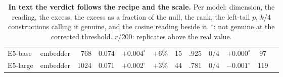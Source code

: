 \begin{table}[H]
\begin{tabular}{llrccccccc|cc}
E5-base & embedder & 768 & $0.074$ & $+0.004^{\circ}$ & $+6\%$ & 15 & .925 & 0/4 & $+0.000^{\circ}$ & 97 \\
E5-large & embedder & 1024 & $0.071$ & $+0.002^{\circ}$ & $+3\%$ & 44 & .781 & 0/4 & $-0.001^{\circ}$ & 119 \\
\bottomrule
\end{tabular}
\par\vspace{2pt}
\endgroup
\caption{\textbf{In text the verdict follows the recipe and the scale.} Per model: dimension, the reading, the excess, the excess as a fraction of the null, the rank, the left-tail $p$, $k$/4 constructions calling it genuine, and the cosine reading beside it. $^{\circ}$: not genuine at the corrected threshold. $r$/200: replicates above the real value.
}
\label{tab:q2-text}
\end{table}
